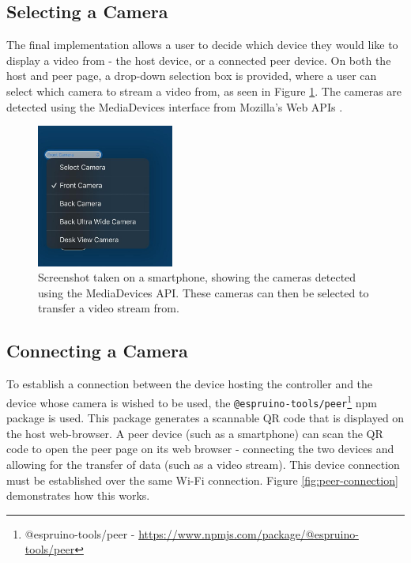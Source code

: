 \documentclass{l4proj}
\begin{document}
\subsection{Selecting a Camera}
The final implementation allows a user to decide which device they would like to display a video from - the host device, or a connected peer device. On both the host and peer page, a drop-down selection box is provided, where a user can select which camera to stream a video from, as seen in Figure \ref{fig:camera-selection}. The cameras are detected using the MediaDevices interface from Mozilla's Web APIs \citep{mediadevices}.

\begin{figure}[!ht]
    \centering
    \includegraphics[width=0.4\textwidth]{images/camera-selection.jpeg}
    \caption{Screenshot taken on a smartphone, showing the cameras detected using the MediaDevices API. These cameras can then be selected to transfer a video stream from.}
    \label{fig:camera-selection}
\end{figure}


\subsection{Connecting a Camera}
To establish a connection between the device hosting the controller and the device whose camera is wished to be used, the \lstinline{@espruino-tools/peer}\footnote{@espruino-tools/peer - \url{https://www.npmjs.com/package/@espruino-tools/peer}} npm package is used. This package generates a scannable QR code that is displayed on the host web-browser. A peer device (such as a smartphone) can scan the QR code to open the peer page on its web browser - connecting the two devices and allowing for the transfer of data (such as a video stream). This device connection must be established over the same Wi-Fi connection. Figure \ref{fig:peer-connection} demonstrates how this works.
\end{document}
